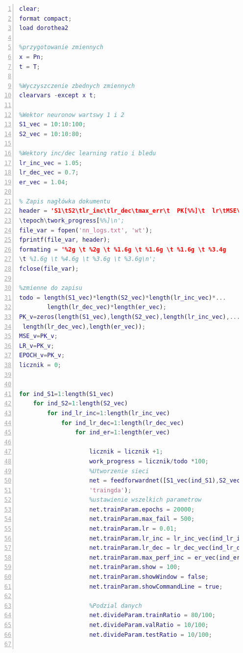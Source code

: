 \documentclass[a4paper, openright, twoside,11pt]{article}
\begin{document}
\begin{lstlisting}[language=Matlab, caption=Skrypt sieci neuronowej, label=skrypt,numbers=left]
clear;
format compact;
load dorothea2

%przygotowanie zmiennych
x = Pn;
t = T;

%Wyczyszczenie zbednych zmiennych
clearvars -except x t;

%Wektor neuronow wartswy 1 i 2
S1_vec = 10:10:100;
S2_vec = 10:10:80;

%Wektory inc/dec learning ratio i bledu
lr_inc_vec = 1.05;
lr_dec_vec = 0.7;
er_vec = 1.04;

% Zapis nagłówka dokumentu
header = 'S1\tS2\tlr_inc\tlr_dec\tmax_err\t  PK[%%]\t  lr\tMSE\t
\tepoch\twork_progress[%%]\n';
file_var = fopen('nn_logs.txt', 'wt');
fprintf(file_var, header);
formating = '%2g \t %2g \t %1.6g \t %1.6g \t %1.6g \t %3.4g 
\t %1.6g \t %4.6g \t %3.6g \t %3.6g\n';
fclose(file_var);

%zmienne do zapisu
todo = length(S1_vec)*length(S2_vec)*length(lr_inc_vec)*...
        length(lr_dec_vec)*length(er_vec);    
PK_v=zeros(length(S1_vec),length(S2_vec),length(lr_inc_vec),...
 length(lr_dec_vec),length(er_vec));
MSE_v=PK_v;
LR_v=PK_v;
EPOCH_v=PK_v;
licznik = 0;


for ind_S1=1:length(S1_vec)
    for ind_S2=1:length(S2_vec)
        for ind_lr_inc=1:length(lr_inc_vec)
            for ind_lr_dec=1:length(lr_dec_vec)
                for ind_er=1:length(er_vec)

                    licznik = licznik +1;
                    work_progress = licznik/todo *100;
                    %Utworzenie sieci
                    net = feedforwardnet([S1_vec(ind_S1),S2_vec(ind_S2)],...
                    'traingda');
                    %ustawienie wszelkich parametrow
                    net.trainParam.epochs = 20000;
                    net.trainParam.max_fail = 500;
                    net.trainParam.lr = 0.01;
                    net.trainParam.lr_inc = lr_inc_vec(ind_lr_inc);
                    net.trainParam.lr_dec = lr_dec_vec(ind_lr_dec);
                    net.trainParam.max_perf_inc = er_vec(ind_er);
                    net.trainParam.show = 100;
                    net.trainParam.showWindow = false;
                    net.trainParam.showCommandLine = true;
                    
                    %Podzial danych
                    net.divideParam.trainRatio = 80/100;
                    net.divideParam.valRatio = 10/100;
                    net.divideParam.testRatio = 10/100;


\end{lstlisting}
\end{document}
